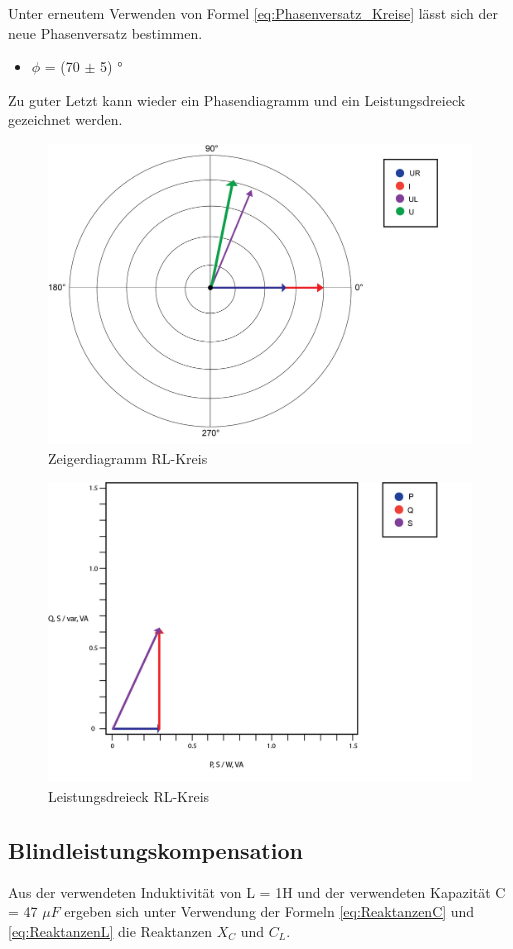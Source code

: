 \documentclass[12pt,a4paper,twoside]{article}
\begin{document}
\noindent
Unter erneutem Verwenden von Formel \ref{eq:Phasenversatz_Kreise} lässt sich der neue Phasenversatz bestimmen.

\begin{itemize}
    \item $\phi$ = (70 $\pm$ 5) °
\end{itemize}

\noindent
Zu guter Letzt kann wieder ein Phasendiagramm und ein Leistungsdreieck gezeichnet werden.

\begin{figure}[H]
    \centering
    \includegraphics[width=0.6\linewidth]{nudes/Phasendiagramm6.png}
    \caption{Zeigerdiagramm RL-Kreis}
    \label{fig:ZeigerdiagrammRL}
\end{figure}

\begin{figure}[H]
    \centering
    \includegraphics[width=0.6\linewidth]{nudes/Leistungsdreieck6.png}
    \caption{Leistungsdreieck RL-Kreis}
    \label{fig:LeistungsdreieckRL}
\end{figure}


\subsection{Blindleistungskompensation}

Aus der verwendeten Induktivität von L = 1H und der verwendeten Kapazität C = 47 $\mu F$ ergeben sich unter Verwendung der Formeln \ref{eq:ReaktanzenC} und \ref{eq:ReaktanzenL} die Reaktanzen $X_C$ und $C_L$.
\end{document}
